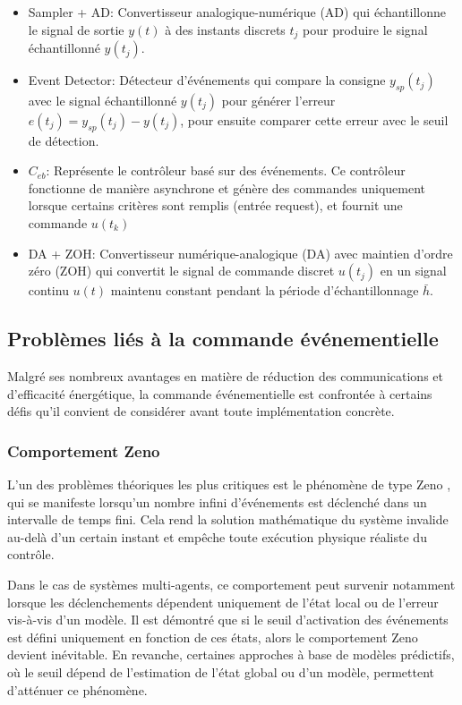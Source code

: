 \begin{itemize}
    \item Sampler + AD: Convertisseur analogique-numérique (AD) qui échantillonne le signal de sortie \( y(t) \) à des instants discrets \( t_j \) pour produire le signal échantillonné \( y(t_j) \).

    \item Event Detector: Détecteur d'événements qui compare la consigne \( y_{sp}(t_j) \) avec le signal échantillonné \( y(t_j) \) pour générer l'erreur $ e(t_j) = y_{sp}(t_j) - y(t_j)$, pour ensuite comparer cette erreur avec le seuil de détection.

    \item $C_{eb}$: Représente le contrôleur basé sur des événements. Ce contrôleur fonctionne de manière asynchrone et génère des commandes uniquement lorsque certains critères sont remplis (entrée request), et fournit une commande $u(t_k)$ 
    \item DA + ZOH: Convertisseur numérique-analogique (DA) avec maintien d'ordre zéro (ZOH) qui convertit le signal de commande discret \( u(t_j) \) en un signal continu \( u(t) \) maintenu constant pendant la période d'échantillonnage \( \bar{h} \).
\end{itemize}

\subsection{Problèmes liés à la commande événementielle}
\label{problemes_cmd_event}

Malgré ses nombreux avantages en matière de réduction des communications et d’efficacité énergétique, la commande événementielle est confrontée à certains défis qu’il convient de considérer avant toute implémentation concrète.

\subsubsection{Comportement Zeno}  
L’un des problèmes théoriques les plus critiques est le phénomène de type Zeno \cite{yu_zeno_2021}, qui se manifeste lorsqu’un nombre infini d’événements est déclenché dans un intervalle de temps fini. Cela rend la solution mathématique du système invalide au-delà d’un certain instant et empêche toute exécution physique réaliste du contrôle.

Dans le cas de systèmes multi-agents, ce comportement peut survenir notamment lorsque les déclenchements dépendent uniquement de l’état local ou de l’erreur vis-à-vis d’un modèle. Il est démontré que si le seuil d’activation des événements est défini uniquement en fonction de ces états, alors le comportement Zeno devient inévitable. En revanche, certaines approches à base de modèles prédictifs, où le seuil dépend de l’estimation de l’état global ou d’un modèle, permettent d’atténuer ce phénomène. 

